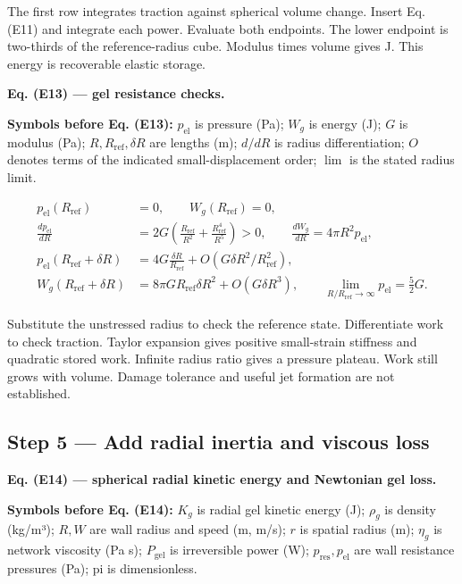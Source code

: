 \documentclass[11pt]{article}
\begin{document}
The first row integrates traction against spherical volume change. Insert Eq. (E11) and integrate each power. Evaluate both endpoints. The lower endpoint is two-thirds of the reference-radius cube. Modulus times volume gives J. This energy is recoverable elastic storage.


\textbf{Eq. (E13) — gel resistance checks.}


\textbf{Symbols before Eq. (E13):} \(p_{\mathrm{el}}\) is pressure (Pa); \(W_g\) is energy (J); \(G\) is modulus (Pa); \(R,R_{\mathrm{ref}},\delta R\) are lengths (m); \(d/dR\) is radius differentiation; \(O\) denotes terms of the indicated small-displacement order; \(\lim\) is the stated radius limit.



\begin{equation*}
\begin{aligned}
p_{\mathrm{el}}(R_{\mathrm{ref}})&=0,\qquad W_g(R_{\mathrm{ref}})=0,\\
\frac{dp_{\mathrm{el}}}{dR}&=2G\left(\frac{R_{\mathrm{ref}}}{R^2}+\frac{R_{\mathrm{ref}}^4}{R^5}\right)>0,\qquad
\frac{dW_g}{dR}=4\pi R^2p_{\mathrm{el}},\\
p_{\mathrm{el}}(R_{\mathrm{ref}}+\delta R)&=4G\frac{\delta R}{R_{\mathrm{ref}}}+O(G\delta R^2/R_{\mathrm{ref}}^2),\\
W_g(R_{\mathrm{ref}}+\delta R)&=8\pi G R_{\mathrm{ref}}\delta R^2+O(G\delta R^3),\qquad
\lim_{R/R_{\mathrm{ref}}\to\infty}p_{\mathrm{el}}=\frac52G.
\end{aligned}
\end{equation*}

Substitute the unstressed radius to check the reference state. Differentiate work to check traction. Taylor expansion gives positive small-strain stiffness and quadratic stored work. Infinite radius ratio gives a pressure plateau. Work still grows with volume. Damage tolerance and useful jet formation are not established.



\subsection*{Step 5 — Add radial inertia and viscous loss}

\textbf{Eq. (E14) — spherical radial kinetic energy and Newtonian gel loss.}


\textbf{Symbols before Eq. (E14):} \(K_g\) is radial gel kinetic energy (J); \(\rho_g\) is density (kg/m³); \(R,W\) are wall radius and speed (m, m/s); \(r\) is spatial radius (m); \(\eta_g\) is network viscosity (Pa s); \(P_{\mathrm{gel}}\) is irreversible power (W); \(p_{\mathrm{res}},p_{\mathrm{el}}\) are wall resistance pressures (Pa); pi is dimensionless.
\end{document}
